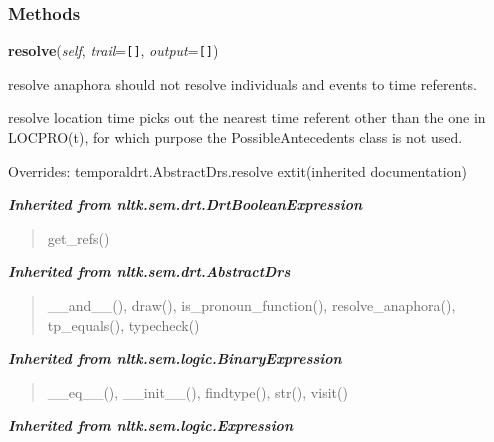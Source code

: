 
  \subsubsection{Methods}

    \vspace{0.5ex}

\hspace{.8\funcindent}\begin{boxedminipage}{\funcwidth}

    \raggedright \textbf{resolve}(\textit{self}, \textit{trail}={\tt \texttt{[}\texttt{]}}, \textit{output}={\tt \texttt{[}\texttt{]}})

\setlength{\parskip}{2ex}
    resolve anaphora should not resolve individuals and events to time 
    referents.

    resolve location time picks out the nearest time referent other than 
    the one in LOCPRO(t), for which purpose the PossibleAntecedents class 
    is not used.

\setlength{\parskip}{1ex}
      Overrides: temporaldrt.AbstractDrs.resolve 	extit{(inherited documentation)}

    \end{boxedminipage}


\large{\textbf{\textit{Inherited from nltk.sem.drt.DrtBooleanExpression}}}

\begin{quote}
get\_refs()
\end{quote}

\large{\textbf{\textit{Inherited from nltk.sem.drt.AbstractDrs}}}

\begin{quote}
\_\_and\_\_(), draw(), is\_pronoun\_function(), resolve\_anaphora(), tp\_equals(), typecheck()
\end{quote}

\large{\textbf{\textit{Inherited from nltk.sem.logic.BinaryExpression}}}

\begin{quote}
\_\_eq\_\_(), \_\_init\_\_(), findtype(), str(), visit()
\end{quote}

\large{\textbf{\textit{Inherited from nltk.sem.logic.Expression}}}

